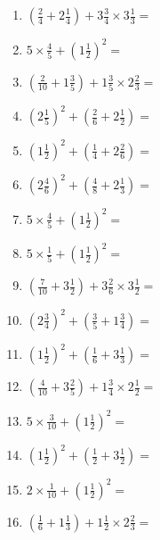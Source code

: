 \documentclass[12pt]{article}
\begin{document}
\begin{enumerate}
\item \large $ (\frac{2}{4} + 2 \frac{1}{4}) + 3 \frac{3}{4} \times 3 \frac{1}{3} = $ \vspace{1.8cm}
\item \large $ 5 \times \frac{4}{5} + (1 \frac{1}{2})^2 = $ \vspace{1.8cm}
\item \large $ (\frac{2}{10} + 1 \frac{3}{5}) + 1 \frac{3}{5} \times 2 \frac{2}{3} = $ \vspace{1.8cm}
\item \large $ (2 \frac{1}{5})^2 + (\frac{2}{6} + 2 \frac{1}{2}) = $ \vspace{1.8cm}
\newpage
\item \large $ (1 \frac{1}{2})^2 + (\frac{1}{4} + 2 \frac{2}{6}) = $ \vspace{1.8cm}
\item \large $ (2 \frac{4}{6})^2 + (\frac{4}{8} + 2 \frac{1}{3}) = $ \vspace{1.8cm}
\item \large $ 5 \times \frac{4}{5} + (1 \frac{1}{2})^2 = $ \vspace{1.8cm}
\item \large $ 5 \times \frac{1}{5} + (1 \frac{1}{2})^2 = $ \vspace{1.8cm}
\item \large $ (\frac{7}{10} + 3 \frac{1}{2}) + 3 \frac{2}{6} \times 3 \frac{1}{2} = $ \vspace{1.8cm}
\item \large $ (2 \frac{3}{4})^2 + (\frac{3}{5} + 1 \frac{3}{4}) = $ \vspace{1.8cm}
\item \large $ (1 \frac{1}{2})^2 + (\frac{1}{6} + 3 \frac{1}{3}) = $ \vspace{1.8cm}
\item \large $ (\frac{4}{10} + 3 \frac{2}{5}) + 1 \frac{3}{4} \times 2 \frac{1}{2} = $ \vspace{1.8cm}
\item \large $ 5 \times \frac{3}{10} + (1 \frac{1}{2})^2 = $ \vspace{1.8cm}
\item \large $ (1 \frac{1}{2})^2 + (\frac{1}{2} + 3 \frac{1}{2}) = $ \vspace{1.8cm}
\newpage
\item \large $ 2 \times \frac{1}{10} + (1 \frac{1}{2})^2 = $ \vspace{1.8cm}
\item \large $ (\frac{1}{6} + 1 \frac{1}{3}) + 1 \frac{1}{2} \times 2 \frac{2}{3} = $ \vspace{1.8cm}

\end{enumerate}
\end{document}

